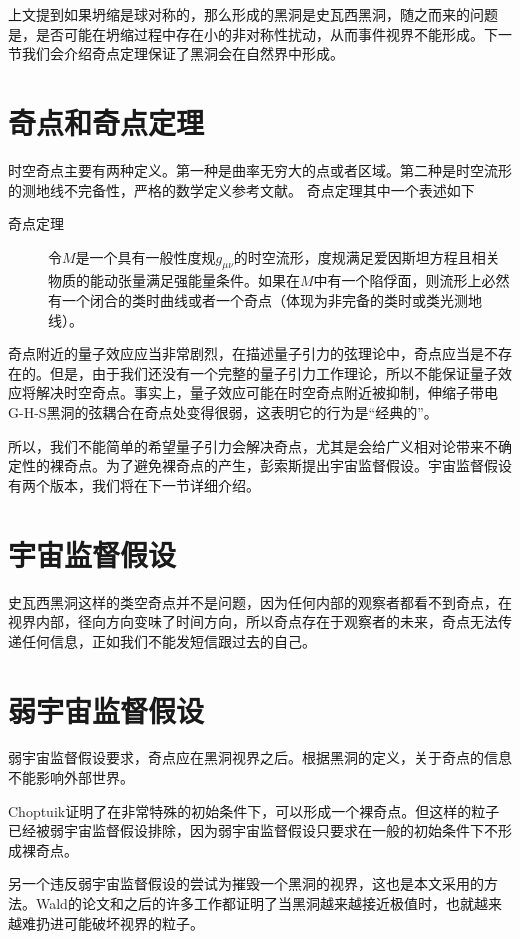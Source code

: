 上文提到如果坍缩是球对称的，那么形成的黑洞是史瓦西黑洞，随之而来的问题是，是否可能在坍缩过程中存在小的非对称性扰动，从而事件视界不能形成。下一节我们会介绍奇点定理保证了黑洞会在自然界中形成。

\section{奇点和奇点定理}
时空奇点主要有两种定义。第一种是曲率无穷大的点或者区域。第二种是时空流形的测地线不完备性，严格的数学定义参考文献\citep{penrose1999question}。
奇点定理其中一个表述如下\citep{陈斌2018广义相对论}

\begin{description}
    \item[奇点定理]  令$M$是一个具有一般性度规$g_{\mu \nu}$的时空流形，度规满足爱因斯坦方程且相关物质的能动张量满足强能量条件。如果在$M$中有一个陷俘面，则流形上必然有一个闭合的类时曲线或者一个奇点（体现为非完备的类时或类光测地线）。
\end{description}

奇点附近的量子效应应当非常剧烈，在描述量子引力的弦理论中，奇点应当是不存在的。但是，由于我们还没有一个完整的量子引力工作理论，所以不能保证量子效应将解决时空奇点。事实上，量子效应可能在时空奇点附近被抑制，伸缩子带电G-H-S黑洞的弦耦合在奇点处变得很弱，这表明它的行为是“经典的”\citep{ong2020space}。

所以，我们不能简单的希望量子引力会解决奇点，尤其是会给广义相对论带来不确定性的裸奇点。为了避免裸奇点的产生，彭索斯提出宇宙监督假设。宇宙监督假设有两个版本，我们将在下一节详细介绍。

\section{宇宙监督假设}
史瓦西黑洞这样的类空奇点并不是问题，因为任何内部的观察者都看不到奇点，在视界内部，径向方向变味了时间方向，所以奇点存在于观察者的未来，奇点无法传递任何信息，正如我们不能发短信跟过去的自己。
\section{弱宇宙监督假设}
弱宇宙监督假设要求，奇点应在黑洞视界之后。根据黑洞的定义，关于奇点的信息不能影响外部世界。

Choptuik证明了在非常特殊的初始条件下\citep{choptuik1993universality}，可以形成一个裸奇点。但这样的粒子已经被弱宇宙监督假设排除，因为弱宇宙监督假设只要求在一般的初始条件下不形成裸奇点。

另一个违反弱宇宙监督假设的尝试为摧毁一个黑洞的视界，这也是本文采用的方法。Wald的论文\citep{wald1974gedanken}和之后的许多工作都证明了当黑洞越来越接近极值时，也就越来越难扔进可能破坏视界的粒子。

